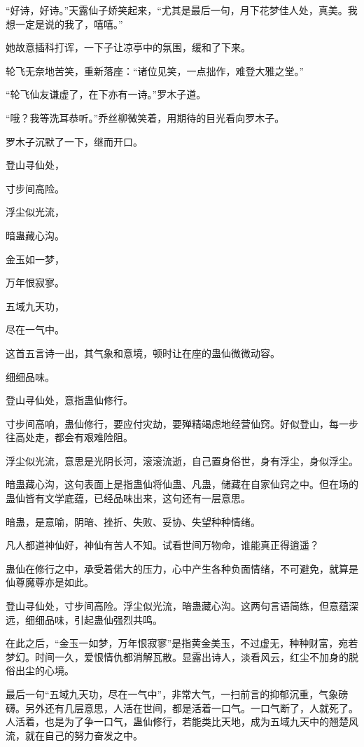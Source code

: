 
\begin{this_body}

“好诗，好诗。”天露仙子娇笑起来，“尤其是最后一句，月下花梦佳人处，真美。我想一定是说的我了，嘻嘻。”

她故意插科打诨，一下子让凉亭中的氛围，缓和了下来。

轮飞无奈地苦笑，重新落座：“诸位见笑，一点拙作，难登大雅之堂。”

“轮飞仙友谦虚了，在下亦有一诗。”罗木子道。

“哦？我等洗耳恭听。”乔丝柳微笑着，用期待的目光看向罗木子。

罗木子沉默了一下，继而开口。

登山寻仙处，

寸步间高险。

浮尘似光流，

暗蛊藏心沟。

金玉如一梦，

万年恨寂寥。

五域九天功，

尽在一气中。

这首五言诗一出，其气象和意境，顿时让在座的蛊仙微微动容。

细细品味。

登山寻仙处，意指蛊仙修行。

寸步间高响，蛊仙修行，要应付灾劫，要殚精竭虑地经营仙窍。好似登山，每一步往高处走，都会有艰难险阻。

浮尘似光流，意思是光阴长河，滚滚流逝，自己置身俗世，身有浮尘，身似浮尘。

暗蛊藏心沟，这句表面上是指蛊仙将仙蛊、凡蛊，储藏在自家仙窍之中。但在场的蛊仙皆有文学底蕴，已经品味出来，这句还有一层意思。

暗蛊，是意喻，阴暗、挫折、失败、妥协、失望种种情绪。

凡人都道神仙好，神仙有苦人不知。试看世间万物命，谁能真正得逍遥？

蛊仙在修行之中，承受着偌大的压力，心中产生各种负面情绪，不可避免，就算是仙尊魔尊亦是如此。

登山寻仙处，寸步间高险。浮尘似光流，暗蛊藏心沟。这两句言语简练，但意蕴深远，细细品味，引起蛊仙强烈共鸣。

在此之后，“金玉一如梦，万年恨寂寥”是指黄金美玉，不过虚无，种种财富，宛若梦幻。时间一久，爱恨情仇都消解瓦散。显露出诗人，淡看风云，红尘不加身的脱俗出尘的心境。

最后一句“五域九天功，尽在一气中”，非常大气，一扫前言的抑郁沉重，气象磅礴。另外还有几层意思，人活在世间，都是活着一口气。一口气断了，人就死了。人活着，也是为了争一口气，蛊仙修行，若能类比天地，成为五域九天中的翘楚风流，就在自己的努力奋发之中。


\end{this_body}
